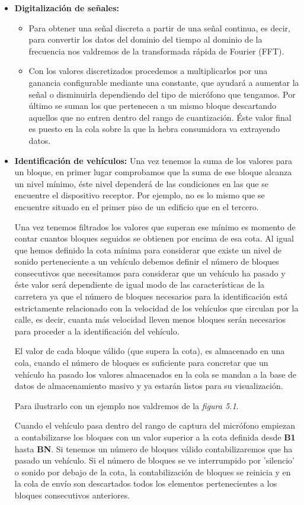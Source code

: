 \begin{itemize}
  \item \textbf{Digitalización de señales: }

    \begin{itemize}
      \item Para obtener una señal discreta a partir de una señal continua, es decir, para convertir los datos del dominio del tiempo al dominio de la frecuencia nos valdremos de la transformada rápida de Fourier (FFT).
      \item Con los valores discretizados procedemos a multiplicarlos por una ganancia configurable mediante una constante, que ayudará a aumentar la señal o disminuirla dependiendo del tipo de micrófono que tengamos. Por último se suman los que pertenecen a un mismo bloque descartando aquellos que no entren dentro del rango de cuantización. Éste valor final es puesto en la cola sobre la que la hebra consumidora va extrayendo datos.
    \end{itemize}

  \item \textbf{Identificación de vehículos:} Una vez tenemos la suma de los valores para un bloque, en primer lugar comprobamos que la suma de ese bloque alcanza un nivel mínimo, éste nivel dependerá de las condiciones en las que se encuentre el dispositivo receptor. Por ejemplo, no es lo mismo que se encuentre situado en el primer piso de un edificio que en el tercero.

  Una vez tenemos filtrados los valores que superan ese mínimo es momento de contar cuantos bloques seguidos se obtienen por encima de esa cota. Al igual que hemos definido la cota mínima para considerar que existe un nivel de sonido perteneciente a un vehículo debemos definir el número de bloques consecutivos que necesitamos para considerar que un vehículo ha pasado y éste valor será dependiente de igual modo de las características de la carretera ya que el número de bloques necesarios para la identificación está estrictamente relacionado con la velocidad de los vehículos que circulan por la calle, es decir, cuanta más velocidad lleven menos bloques serán necesarios para proceder a la identificación del vehículo.

  El valor de cada bloque válido (que supera la cota), es almacenado en una cola, cuando el número de bloques es suficiente para concretar que un vehículo ha pasado los valores almacenados en la cola se mandan a la base de datos de almacenamiento masivo y ya estarán listos para su visualización.

  Para ilustrarlo con un ejemplo nos valdremos de la \textit{figura 5.1}.

  Cuando el vehículo pasa dentro del rango de captura del micrófono empiezan a contabilizarse los bloques con un valor superior a la cota definida desde \textbf{B1} hasta \textbf{BN}. Si tenemos un número de bloques válido contabilizaremos que ha pasado un vehículo. Si el número de bloques se ve interrumpido por 'silencio' o sonido por debajo de la cota, la contabilización de bloques se reinicia y en la cola de envío son descartados todos los elementos pertenecientes a los bloques consecutivos anteriores.
\end{itemize}
